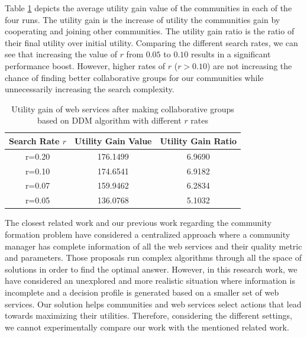 Table \ref{table:valueandgain} depicts the average utility gain value of the communities in each of the four runs. The utility gain is the increase of utility the communities gain by cooperating and joining other communities. The utility gain ratio is the ratio of their final utility over initial utility. Comparing the different search rates, we can see that increasing the value of $r$ from $0.05$ to $0.10$ results in a significant performance boost. However, higher rates of $r$ ($r > 0.10$) are not increasing the chance of finding better collaborative groups for our communities while unnecessarily increasing the search complexity.

\begin{table}[ht]
\caption{Utility gain of web services after making collaborative groups based on DDM algorithm with different $r$ rates} %
\centering %
{\renewcommand{\arraystretch}{1.2}
\begin{tabular}{c|c|c} %
\hline\hline %
Search Rate $r$ & Utility Gain Value & Utility Gain Ratio \\ [0.5ex] %
\hline %
r=0.20 & 176.1499 & 6.9690 \\
r=0.10 & 174.6541 & 6.9182 \\
r=0.07 & 159.9462 & 6.2834 \\
r=0.05 & 136.0768 & 5.1032 \\ [1ex] %
\hline %
\end{tabular}
}
\label{table:valueandgain} %
\end{table}


%


The closest related work \cite{10.1109/TSC.2012.12,
DBLP:conf/IEEEscc/LimTMB12, DBLP:conf/IEEEscc/KhosravifarABT11} and our
previous work \cite{journal-community-formation} regarding the community formation problem have considered a centralized approach where a community manager has complete information of all the web services and their quality
metric and parameters. Those proposals run complex algorithms through all the space of
solutions in order to find the optimal answer. However, in this research work, we
have considered an unexplored and more realistic situation where information is incomplete and a decision
profile is generated based on a smaller set of web services. Our solution helps
communities and web services select actions that lead towards
maximizing their utilities. Therefore, considering the different settings,
we cannot experimentally compare our work with the mentioned related work.


